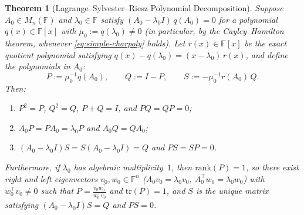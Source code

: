 \documentclass[11pt,a4paper]{article}
\newtheorem{theorem}{Theorem}[section]
\theoremstyle{definition}
\newcommand{\tr}{\mathrm{tr}}
\begin{document}
\begin{theorem}[Lagrange--Sylvester--Riesz Polynomial Decomposition]\label{thm:riesz-poly}
Suppose $A_0 \in M_n(\mathbb{F})$ and $\lambda_0 \in \mathbb{F}$ satisfy
$(A_0 - \lambda_0 I)\, q(A_0) = 0$ for a polynomial $q(x) \in \mathbb{F}[x]$ with
$\mu_0 := q(\lambda_0) \neq 0$ (in particular, by the Cayley--Hamilton theorem,
whenever \eqref{eq:simple-charpoly} holds). Let $r(x) \in \mathbb{F}[x]$ be the exact
quotient polynomial satisfying $q(x) - q(\lambda_0) = (x - \lambda_0)\, r(x)$, and
define the polynomials in $A_0$:
\begin{equation}\label{eq:PQS-poly}
  P := \mu_0^{-1} q(A_0), \qquad
  Q := I - P, \qquad
  S := -\mu_0^{-1} r(A_0)\, Q.
\end{equation}
Then:
\begin{enumerate}
  \item $P^2 = P$, $Q^2 = Q$, $P + Q = I$, and $PQ = QP = 0$;
  \item $A_0 P = P A_0 = \lambda_0 P$ and $A_0 Q = Q A_0$;
  \item $(A_0 - \lambda_0 I) S = S (A_0 - \lambda_0 I) = Q$ and $P S = S P = 0$.
\end{enumerate}
Furthermore, if $\lambda_0$ has algebraic multiplicity~$1$, then $\mathrm{rank}(P) = 1$,
so there exist right and left eigenvectors $v_0, w_0 \in \mathbb{F}^n$ ($A_0 v_0 =
\lambda_0 v_0$, $A_0^\top w_0 = \lambda_0 w_0$) with $w_0^\top v_0 \neq 0$ such that
$P = \frac{v_0 w_0^\top}{w_0^\top v_0}$ and $\tr(P) = 1$, and $S$ is the unique matrix
satisfying $(A_0 - \lambda_0 I) S = Q$ and $P S = 0$.
\end{theorem}
\end{document}
